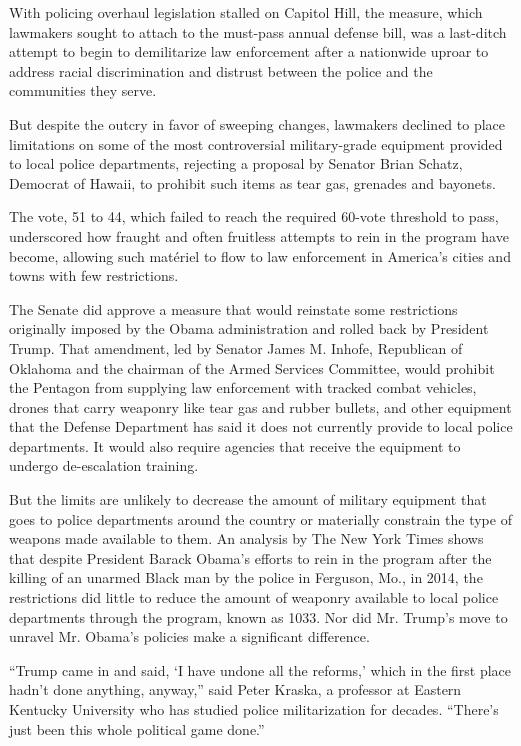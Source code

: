 With policing overhaul legislation stalled on Capitol Hill, the measure,
which lawmakers sought to attach to the must-pass annual defense bill,
was a last-ditch attempt to begin to demilitarize law enforcement after
a nationwide uproar to address racial discrimination and distrust
between the police and the communities they serve.

But despite the outcry in favor of sweeping changes, lawmakers declined
to place limitations on some of the most controversial military-grade
equipment provided to local police departments, rejecting a proposal by
Senator Brian Schatz, Democrat of Hawaii, to prohibit such items as tear
gas, grenades and bayonets.

The vote, 51 to 44, which failed to reach the required 60-vote threshold
to pass, underscored how fraught and often fruitless attempts to rein in
the program have become, allowing such matériel to flow to law
enforcement in America's cities and towns with few restrictions.

The Senate did approve a measure that would reinstate some restrictions
originally imposed by the Obama administration and rolled back by
President Trump. That amendment, led by Senator James M. Inhofe,
Republican of Oklahoma and the chairman of the Armed Services Committee,
would prohibit the Pentagon from supplying law enforcement with tracked
combat vehicles, drones that carry weaponry like tear gas and rubber
bullets, and other equipment that the Defense Department has said it
does not currently provide to local police departments. It would also
require agencies that receive the equipment to undergo de-escalation
training.

But the limits are unlikely to decrease the amount of military equipment
that goes to police departments around the country or materially
constrain the type of weapons made available to them. An analysis by The
New York Times shows that despite President Barack Obama's efforts to
rein in the program after the killing of an unarmed Black man by the
police in Ferguson, Mo., in 2014, the restrictions did little to reduce
the amount of weaponry available to local police departments through the
program, known as 1033. Nor did Mr. Trump's move to unravel Mr. Obama's
policies make a significant difference.

``Trump came in and said, `I have undone all the reforms,' which in the
first place hadn't done anything, anyway,'' said Peter Kraska, a
professor at Eastern Kentucky University who has studied police
militarization for decades. ``There's just been this whole political
game done.''

